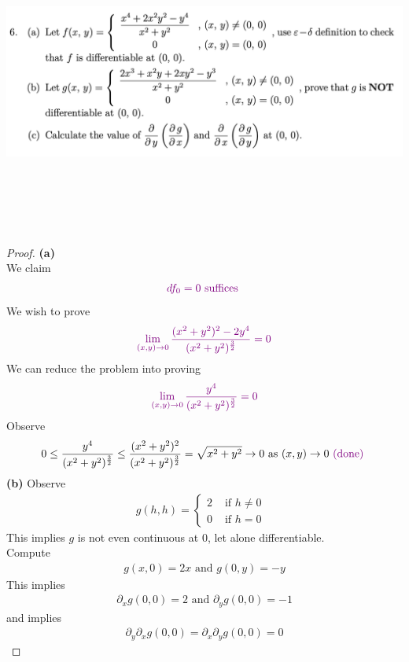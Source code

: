 \documentclass{report}
\begin{document}
\begin{question}{}{}
\includegraphics[height=10cm,width=18cm]{ahw5q6}
\end{question}
\begin{proof}
\textbf{(a)}\\

We claim 
\begin{align*}
\textcolor{violet}{df_0=0\text{ suffices }}
\end{align*}
We wish to prove 
\begin{align*}
  \textcolor{violet}{\lim_{(x,y)\to 0} \frac{(x^2+y^2)^2-2y^4}{(x^2+y^2)^{\frac{3}{2}}}=0}
\end{align*}
We can reduce the problem into proving 
\begin{align*}
\textcolor{violet}{\lim_{(x,y)\to 0} \frac{y^4}{(x^2+y^2)^{\frac{3}{2}}}=0}
\end{align*}
Observe 
\begin{align*}
0\leq  \frac{y^4}{(x^2+y^2)^{\frac{3}{2}}}\leq  \frac{(x^2+y^2)^2}{(x^2+y^2)^{\frac{3}{2}}}= \sqrt{x^2+y^2}\to 0\text{ as }(x,y)\to 0 \textcolor{violet}{\text{ (done) }}
\end{align*}
\textbf{(b)} 
Observe 
\begin{align*}
g(h,h)=\begin{cases}
  2& \text{ if $h\neq 0$ }\\
  0& \text{ if $h=0$ }
\end{cases}
\end{align*}
This implies $g$ is not even continuous at $0$, let alone differentiable.\\

Compute 
\begin{align*}
g(x,0)=2x\text{ and }g(0,y)=-y 
\end{align*}
This implies 
\begin{align*}
\partial_x g(0,0)=2\text{ and }\partial_y g(0,0)=-1
\end{align*}
and implies 
\begin{align*}
\partial_y \partial_x g(0,0)=\partial_x \partial _y g(0,0)=0
\end{align*}
\end{proof}
\end{document}
